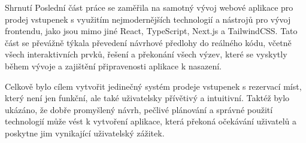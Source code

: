 \begin{section}{Shrnutí}
    Poslední část práce se zaměřila na samotný vývoj webové aplikace pro prodej vstupenek s využitím nejmodernějších technologií a nástrojů pro vývoj frontendu, jako jsou mimo jiné React, TypeScript, Next.js a TailwindCSS.
    Tato část se převážně týkala převedení návrhové předlohy do reálného kódu, včetně všech interaktivních prvků, řešení a překonání všech výzev, které se vyskytly během vývoje a zajištění připravenosti aplikace k nasazení.

    Celkově bylo cílem vytvořit jedinečný systém prodeje vstupenek s rezervací míst, který není jen funkční, ale také uživatelsky přívětivý a intuitivní.
    Taktéž bylo ukázáno, že dobře promyšlený návrh, pečlivé plánování a správné použití technologií může vést k vytvoření aplikace, která překoná očekávání uživatelů a poskytne jim vynikající uživatelský zážitek.
\end{section}

